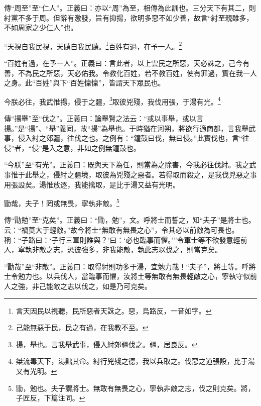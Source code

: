 {\noindent\zhuan{}\fzbyks 傳“周至”至“仁人”。正義曰：亦以“周”為至，相傳為此訓也。三分天下有其二，則紂黨不多于周。但辭有激發，旨有抑揚，欲明多惡不如少善，故言“紂至親雖多，不如周家之少仁人”也。 \par}

“天視自我民視，天聽自我民聽。\footnote{言天因民以視聽，民所惡者天誅之。惡，烏路反，一音如字。}百姓有過，在予一人。\footnote{己能無惡于民，民之有過，在我教不至。}

{\noindent\shu{}\fzkt “百姓有過，在予一人”。正義曰：言此者，以上雲民之所惡，天必誅之，己今有善，不為民之所惡，天必佑我。令教化百姓，若不教百姓，使有罪過，實在我一人之身。此“百姓”與下“百姓懍懍”，皆謂天下眾民也。 \par}

今朕必往，我武惟揚，侵于之疆，\footnote{揚，舉也。言我舉武事，侵入紂郊疆伐之。疆，居良反。}取彼兇殘，我伐用張，于湯有光。\footnote{桀流毒天下，湯黜其命。紂行兇殘之德，我以兵取之。伐惡之道張設，比于湯又有光明。}

{\noindent\zhuan{}\fzbyks 傳“揚舉”至“伐之”。正義曰：論舉賢之法云：“或以事舉，或以言揚。”是“揚”、“舉”義同，故“揚”為舉也。于時猶在河朔，將欲行適商都，言我舉武事，侵入紂之郊疆，往伐之也。之例有：“鐘鼓曰伐，無曰侵。”此實伐也，言“往侵”者，“侵”是入之意，非如之例無鐘鼓也。 \par}

{\noindent\shu{}\fzkt “今朕”至“有光”。正義曰：既與天下為任，則當為之除害，今我必往伐紂。我之武事惟于此舉之，侵紂之疆境，取彼為兇殘之惡者。若得取而殺之，是我伐兇惡之事用張設矣。湯惟放逐，我能擒取，是比于湯又益有光明。 \par}

勖哉，夫子！罔或無畏，寧執非敵。\footnote{勖，勉也。夫子謂將士。無敢有無畏之心，寧執非敵之志，伐之則克矣。將，子匠反，下篇注同。}

{\noindent\zhuan{}\fzbyks 傳“勖勉”至“克矣”。正義曰：“勖，勉”，文。呼將士而誓之，知“夫子”是將士也。云：“禍莫大于輕敵。”故今將士“無敢有無畏之心”，令其必以前敵為可畏也。稱：“子路曰：‘子行三軍則誰與？’曰：‘必也臨事而懼。’”令軍士等不欲發意輕前人，寧執非敵之志，恐彼強多，非我能敵，執此志以伐之，則當克矣。 \par}

{\noindent\shu{}\fzkt “勖哉”至“非敵”。正義曰：取得紂則功多于湯，宜勉力哉！“夫子”，將士等。呼將士令勉力也。以兵伐人，當臨事而懼，汝將土等無敢有無畏輕敵之心，寧執守似前人之強，非己能敵之志以伐之，如是乃可克矣。 \par}

